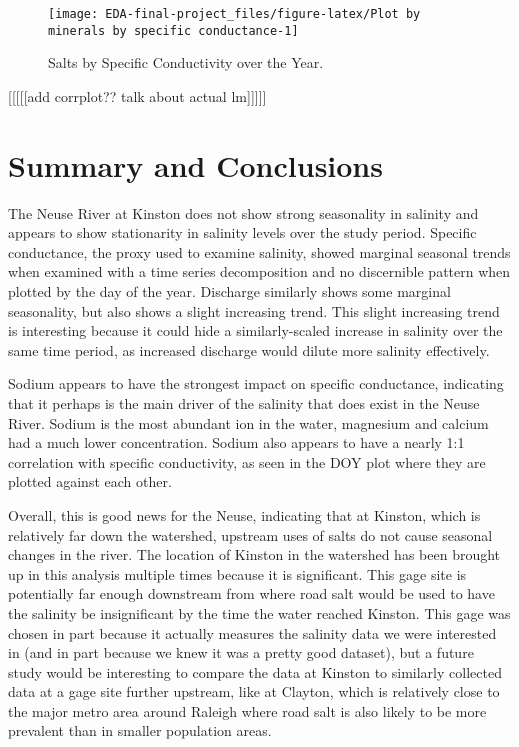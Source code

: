 \documentclass[
  12pt,
]{article}
\begin{document}
\begin{figure}

{\centering \texttt{[image: EDA-final-project\_files/figure-latex/Plot by minerals by specific conductance-1]} 

}

\caption{Salts by Specific Conductivity over the Year.}\label{fig:Plot by minerals by specific conductance}
\end{figure}

{[}{[}{[}{[}{[}add corrplot?? talk about actual lm{]}{]}{]}{]}{]}

\newpage

\hypertarget{summary-and-conclusions}{%
\section{Summary and Conclusions}\label{summary-and-conclusions}}

The Neuse River at Kinston does not show strong seasonality in salinity
and appears to show stationarity in salinity levels over the study
period. Specific conductance, the proxy used to examine salinity, showed
marginal seasonal trends when examined with a time series decomposition
and no discernible pattern when plotted by the day of the year.
Discharge similarly shows some marginal seasonality, but also shows a
slight increasing trend. This slight increasing trend is interesting
because it could hide a similarly-scaled increase in salinity over the
same time period, as increased discharge would dilute more salinity
effectively.

Sodium appears to have the strongest impact on specific conductance,
indicating that it perhaps is the main driver of the salinity that does
exist in the Neuse River. Sodium is the most abundant ion in the water,
magnesium and calcium had a much lower concentration. Sodium also
appears to have a nearly 1:1 correlation with specific conductivity, as
seen in the DOY plot where they are plotted against each other.

Overall, this is good news for the Neuse, indicating that at Kinston,
which is relatively far down the watershed, upstream uses of salts do
not cause seasonal changes in the river. The location of Kinston in the
watershed has been brought up in this analysis multiple times because it
is significant. This gage site is potentially far enough downstream from
where road salt would be used to have the salinity be insignificant by
the time the water reached Kinston. This gage was chosen in part because
it actually measures the salinity data we were interested in (and in
part because we knew it was a pretty good dataset), but a future study
would be interesting to compare the data at Kinston to similarly
collected data at a gage site further upstream, like at Clayton, which
is relatively close to the major metro area around Raleigh where road
salt is also likely to be more prevalent than in smaller population
areas.
\end{document}
